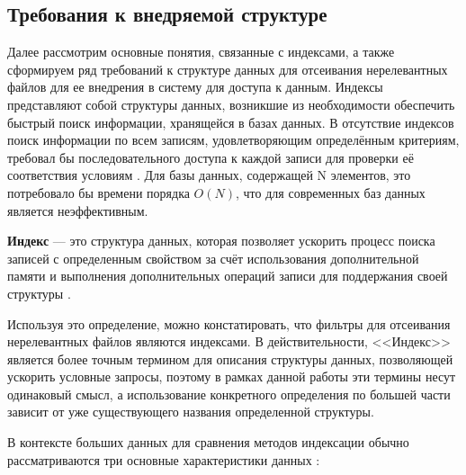 \subsection{Требования к внедряемой структуре}

Далее рассмотрим основные понятия, связанные с индексами, а также сформируем ряд требований к структуре данных для отсеивания нерелевантных файлов для ее внедрения в систему для доступа к данным. Индексы представляют собой структуры данных, возникшие из необходимости обеспечить быстрый поиск информации, хранящейся в базах данных. В отсутствие индексов поиск информации по всем записям, удовлетворяющим определённым критериям, требовал бы последовательного доступа к каждой записи для проверки её соответствия условиям \cite{Tree_Data_Structures_and_Efficient_Indexing_Techniques}. Для базы данных, содержащей N элементов, это потребовало бы времени порядка $O(N)$, что для современных баз данных является неэффективным.

\begin{definition}
    \textbf{Индекс} --- это структура данных, которая позволяет ускорить процесс поиска записей с определенным свойством за счёт использования дополнительной памяти и выполнения дополнительных операций записи для поддержания своей структуры \cite{Tree_Data_Structures_and_Efficient_Indexing_Techniques}.
\end{definition}

Используя это определение, можно констатировать, что фильтры для отсеивания нерелевантных файлов являются индексами. В действительности, {<<Индекс>>} является более точным термином для описания структуры данных, позволяющей ускорить условные запросы, поэтому в рамках данной работы эти термины несут одинаковый смысл, а использование конкретного определения по большей части зависит от уже существующего названия определенной структуры. 

В контексте больших данных для сравнения методов индексации обычно рассматриваются три основные характеристики данных \cite{Big_data_The_Vs}:

